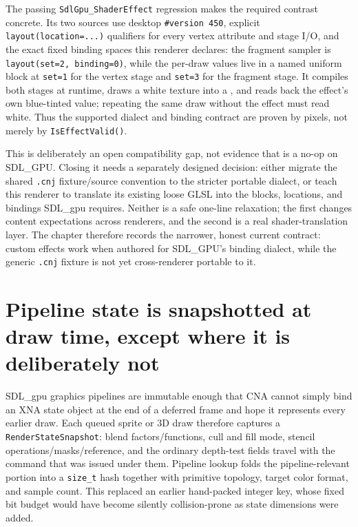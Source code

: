 The passing \texttt{SdlGpu\_ShaderEffect} regression makes the required contrast concrete. Its
two sources use desktop \texttt{\#version 450}, explicit \texttt{layout(location=...)} qualifiers
for every vertex attribute and stage I/O, and the exact fixed binding spaces this renderer
declares: the fragment sampler is \texttt{layout(set=2, binding=0)}, while the per-draw values
live in a named uniform block at \texttt{set=1} for the vertex stage and \texttt{set=3} for the
fragment stage. It compiles both stages at runtime, draws a white texture into a
, and reads back the effect's own blue-tinted value; repeating the
same draw without the effect must read white. Thus the supported dialect and binding contract
are proven by pixels, not merely by \texttt{IsEffectValid()}.

This is deliberately an open compatibility gap, not evidence that  is a
no-op on SDL\_GPU. Closing it needs a separately designed decision: either migrate the shared
\texttt{.cnj} fixture/source convention to the stricter portable dialect, or teach this renderer
to translate its existing loose GLSL into the blocks, locations, and bindings SDL\_gpu requires.
Neither is a safe one-line relaxation; the first changes content expectations across renderers,
and the second is a real shader-translation layer. The chapter therefore records the narrower,
honest current contract: custom effects work when authored for SDL\_GPU's binding dialect, while
the generic \texttt{.cnj} fixture is not yet cross-renderer portable to it.

\section{Pipeline state is snapshotted at draw time, except where it is deliberately not}

SDL\_gpu graphics pipelines are immutable enough that CNA cannot simply bind an XNA state object
at the end of a deferred frame and hope it represents every earlier draw. Each queued sprite or
3D draw therefore captures a \texttt{RenderStateSnapshot}: blend factors/functions, cull and
fill mode, stencil operations/masks/reference, and the ordinary depth-test fields travel with
the command that was issued under them. Pipeline lookup folds the pipeline-relevant portion into
a \texttt{size\_t} hash together with primitive topology, target color format, and sample count.
This replaced an earlier hand-packed integer key, whose fixed bit budget would have become
silently collision-prone as state dimensions were added.

